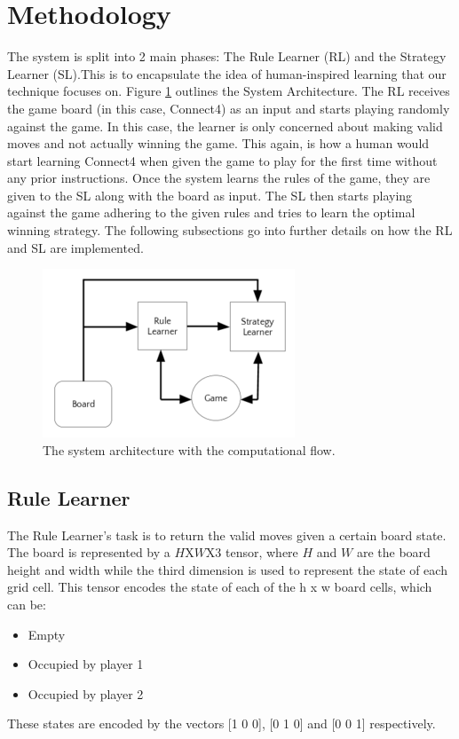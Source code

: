 \section{Methodology}
The system is split into 2 main phases: The Rule Learner (RL) and the Strategy Learner (SL).This is to encapsulate the idea of human-inspired learning that our technique focuses on. Figure \ref{fig:sys_arch} outlines the System Architecture. The RL receives the game board (in this case, Connect4) as an input and starts playing randomly against the game. In this case, the learner is only concerned about making valid moves and not actually winning the game. This again, is how a human would start learning Connect4 when given the game to play for the first time without any prior instructions. Once the system learns the rules of the game, they are given to the SL along with the board as input. The SL then starts playing against the game adhering to the given rules and tries to learn the optimal winning strategy. The following subsections go into further details on how the RL and SL are implemented.

\begin{figure}
  \includegraphics[width=\linewidth]{sys_arch.png}
  \caption{The system architecture with the computational flow.}
  \label{fig:sys_arch}
\end{figure}

\subsection{Rule Learner}
The Rule Learner’s task is to return the valid moves given a certain board state. The board is represented by a $H$X$W$X$3$ tensor, where $H$ and $W$ are the board height and width while the third dimension is used to represent the state of each grid cell. This tensor encodes the state of each of the h x w board cells, which can be:
\begin{itemize}
 \item Empty
 \item Occupied by player 1
 \item Occupied by player 2
\end{itemize}
These states are encoded by the vectors [1 0 0], [0 1 0] and [0 0 1] respectively.

